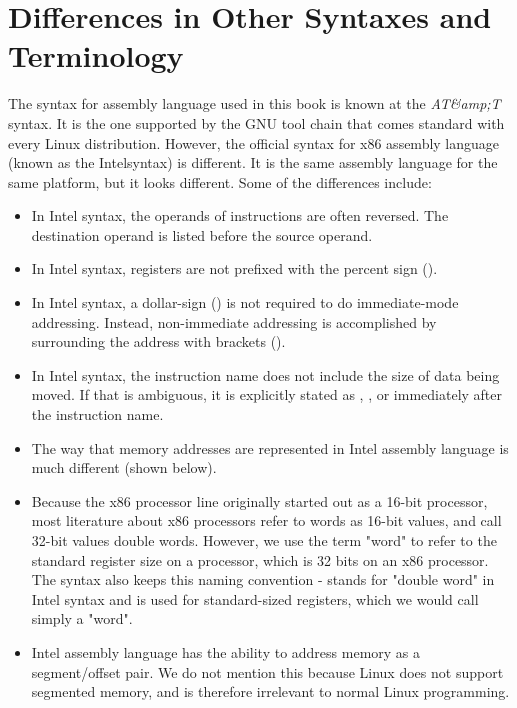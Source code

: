 \section{Differences in Other Syntaxes and Terminology}

The syntax for assembly language used in this book is known at the
\emph{AT&amp;T} syntax.  It is the one supported by the 
GNU tool chain that comes standard with every Linux distribution.  However,
the official syntax for x86 assembly language (known as the Intel\textregistered syntax)
is different.  It is
the same assembly language for the same platform, but it looks different.
Some of the differences include:

\begin{itemize}\item In Intel syntax, the operands of instructions are often reversed.  The destination operand is listed before the source operand. 
\item In Intel syntax, registers are not prefixed with the percent sign (\icode{\%}). 
\item In Intel syntax, a dollar-sign (\icode{\$}) is not required to do immediate-mode addressing.  Instead, non-immediate addressing is accomplished by surrounding the address with brackets (\icode{[]}). 
\item In Intel syntax, the instruction name does not include the size of data being moved.  If that is ambiguous, it is explicitly stated as , , or  immediately after the instruction name. 
\item The way that memory addresses are represented in Intel assembly language is much different (shown below). 
\item Because the x86 processor line originally started out as a 16-bit processor, most literature about x86 processors refer to words as 16-bit values, and call 32-bit values double words.  However, we use the term "word" to refer to the standard register size on a processor, which is 32 bits on an x86 processor.  The syntax also keeps this naming convention -  stands for "double word" in Intel syntax and is used for standard-sized registers, which we would call simply a "word". 
\item Intel assembly language has the ability to address memory as a segment/offset pair.  We do not mention this because Linux does not support segmented memory, and is therefore irrelevant to normal Linux programming. 
\end{itemize}

